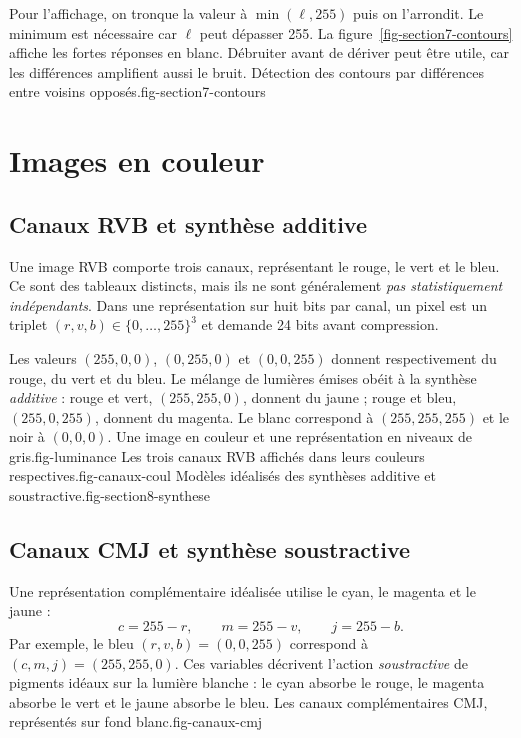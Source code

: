 Pour l'affichage, on tronque la valeur à $\min(\ell,255)$ puis on l'arrondit. Le minimum est nécessaire car $\ell$ peut dépasser 255. La figure~\ref{fig-section7-contours} affiche les fortes réponses en blanc. Débruiter avant de dériver peut être utile, car les différences amplifient aussi le bruit.
{Détection des contours par différences entre voisins opposés.}{fig-section7-contours}

\section{Images en couleur}
\subsection{Canaux RVB et synthèse additive}
Une image RVB comporte trois canaux, représentant le rouge, le vert et le bleu. Ce sont des tableaux distincts, mais ils ne sont généralement \emph{pas statistiquement indépendants}. Dans une représentation sur huit bits par canal, un pixel est un triplet $(r,v,b)\in\{0,\ldots,255\}^3$ et demande 24 bits avant compression.

Les valeurs $(255,0,0)$, $(0,255,0)$ et $(0,0,255)$ donnent respectivement du rouge, du vert et du bleu. Le mélange de lumières émises obéit à la synthèse \emph{additive} : rouge et vert, $(255,255,0)$, donnent du jaune ; rouge et bleu, $(255,0,255)$, donnent du magenta. Le blanc correspond à $(255,255,255)$ et le noir à $(0,0,0)$.
{Une image en couleur et une représentation en niveaux de gris.}{fig-luminance}
{Les trois canaux RVB affichés dans leurs couleurs respectives.}{fig-canaux-coul}
{Modèles idéalisés des synthèses additive et soustractive.}{fig-section8-synthese}

\subsection{Canaux CMJ et synthèse soustractive}
Une représentation complémentaire idéalisée utilise le cyan, le magenta et le jaune :
\[
 c=255-r,\qquad m=255-v,\qquad j=255-b.
\]
Par exemple, le bleu $(r,v,b)=(0,0,255)$ correspond à $(c,m,j)=(255,255,0)$. Ces variables décrivent l'action \emph{soustractive} de pigments idéaux sur la lumière blanche : le cyan absorbe le rouge, le magenta absorbe le vert et le jaune absorbe le bleu.
{Les canaux complémentaires CMJ, représentés sur fond blanc.}{fig-canaux-cmj}

